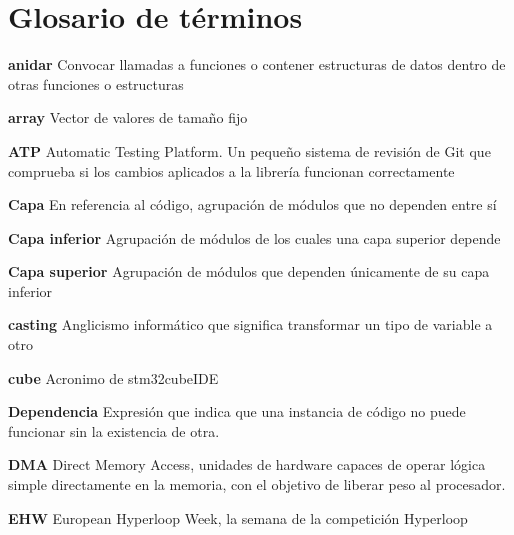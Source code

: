 \documentclass{report}
\begin{document}
\setcounter{tocdepth}{3}
\setcounter{secnumdepth}{3}
\newpage
\setlength{\cftbeforetoctitleskip}{-3em}
\tableofcontents
\newpage

\section{Glosario de términos}
\setlength{\parindent}{0cm}

\textbf{anidar} Convocar llamadas a funciones o contener estructuras de datos dentro de otras funciones o estructuras
\par \vspace{0.2 cm}
\textbf{array} Vector de valores de tamaño fijo
\par \vspace{0.2 cm}
\textbf{ATP} Automatic Testing Platform. Un pequeño sistema de revisión de Git que comprueba si los cambios aplicados a la librería funcionan correctamente
\par \vspace{0.2 cm}
\textbf{Capa} En referencia al código, agrupación de módulos que no dependen entre sí
\par \vspace{0.2 cm}
\textbf{Capa inferior} Agrupación de módulos de los cuales una capa superior depende
\par \vspace{0.2 cm}
\textbf{Capa superior} Agrupación de módulos que dependen únicamente de su capa inferior
\par \vspace{0.2 cm}
\textbf{casting} Anglicismo informático que significa transformar un tipo de variable a otro
\par \vspace{0.2 cm}
\textbf{cube} Acronimo de stm32cubeIDE
\par \vspace{0.2 cm}
\textbf{Dependencia} Expresión que indica que una instancia de código no puede funcionar sin la existencia de otra. 
\par \vspace{0.2 cm}
\textbf{DMA} Direct Memory Access, unidades de hardware capaces de operar lógica simple directamente en la memoria, con el objetivo de liberar peso al procesador. 
\par \vspace{0.2 cm}
\textbf{EHW} European Hyperloop Week, la semana de la competición Hyperloop
\par \vspace{0.2 cm}
\end{document}
